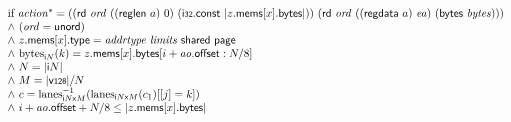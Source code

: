 $$\begin{array}[t]{@{}lrcl@{}l@{}}
{\begin{array}[t]{@{}l@{}}
\mbox{if}~ {{\mathit{action}}^\ast} = ((\mathsf{rd}~{\mathit{ord}}~((\mathsf{reglen}~a)~0)~(\mathsf{i{\scriptstyle 32}}{.}\mathsf{const}~{|z{.}\mathsf{mems}{}[x]{.}\mathsf{bytes}|}))~(\mathsf{rd}~{\mathit{ord}}~((\mathsf{regdata}~a)~{\mathit{ea}})~(\mathsf{bytes}~{\mathit{bytes}}))) \\
{\land}~ ({\mathit{ord}} = \mathsf{unord}) \\
{\land}~ z{.}\mathsf{mems}{}[x]{.}\mathsf{type} = {\mathit{addrtype}}~{\mathit{limits}}~\mathsf{shared}~\mathsf{page} \\
{\land}~ {{\mathrm{bytes}}}_{{\mathsf{i}}{N}}(k) = z{.}\mathsf{mems}{}[x]{.}\mathsf{bytes}{}[i + {\mathit{ao}}{.}\mathsf{offset} : N / 8] \\
{\land}~ N = {|{\mathsf{i}}{N}|} \\
{\land}~ M = {|\mathsf{v{\scriptstyle 128}}|} / N \\
{\land}~ c = {{{{\mathrm{lanes}}}_{{{\mathsf{i}}{N}}{\mathsf{x}}{M}}^{{-1}}}}{({{\mathrm{lanes}}}_{{{\mathsf{i}}{N}}{\mathsf{x}}{M}}(c_1){}[{}[j] = k])} \\
{\land}~ i + {\mathit{ao}}{.}\mathsf{offset} + N / 8 \leq {|z{.}\mathsf{mems}{}[x]{.}\mathsf{bytes}|} \\
\end{array}
} \\
\end{array}
$$

